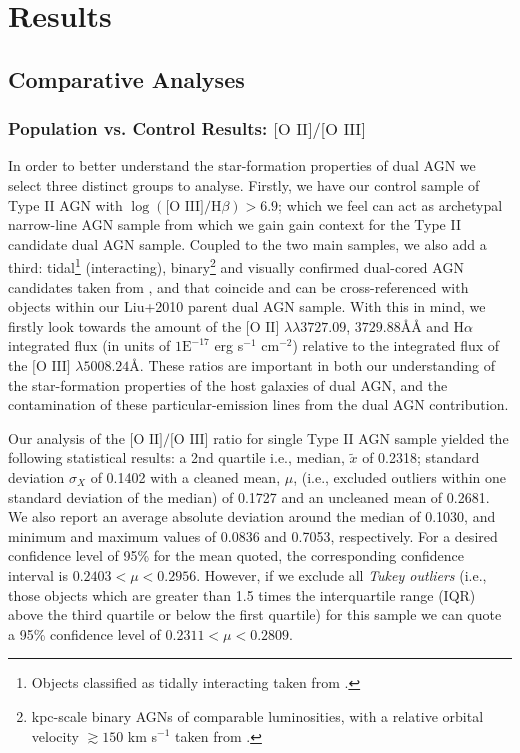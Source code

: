 \section{Results}

\subsection{Comparative Analyses}
 \subsubsection{Population vs. Control Results: $\text{[O II]}/\text{[O III]}$}

In order to better understand the star-formation properties of dual AGN we select three distinct groups to analyse. Firstly, we have our control sample of Type II AGN with $\log{(\text{[O III]}/\text{H}\beta)}>{6.9}$; which we feel can act as archetypal narrow-line AGN sample from which we gain gain context for the Type II candidate dual AGN sample. Coupled to the two main samples, we also add a third: tidal\footnote{\tiny{Objects classified as tidally interacting taken from \cite{Liu_2011}.}} (interacting), binary\footnote{\tiny{kpc-scale binary AGNs of comparable luminosities, with a relative orbital velocity $\gtrsim{150}$ km s$^{-1}$ taken from \cite{Shen_Liu_Greene_Strauss_2011}.}} and visually confirmed dual-cored AGN candidates taken from \cite{Ge_Hu_Wang_Bai_Zhang_2012}, and that coincide and can be cross-referenced with objects within our Liu+2010 parent dual AGN sample. With this in mind, we firstly look towards the amount of the $\text{[O II]}$ $\lambda\lambda$$3727.09$, $3729.88$\AA\AA{} and $\text{H}\alpha$ integrated flux (in units of $1\text{E}^{-17}$ erg s$^{-1}$ cm$^{-2}$) relative to the integrated flux of the $\text{[O III]}$ $\lambda$$5008.24$\AA. These ratios are important in both our understanding of the star-formation properties of the host galaxies of dual AGN, and the contamination of these particular-emission lines from the dual AGN contribution.

Our analysis of the $\text{[O II]/[O III]}$ ratio for single Type II AGN sample yielded the following statistical results: a 2nd quartile i.e., median, $\tilde{x}$ of 0.2318; standard deviation $\sigma_{X}$ of 0.1402 with a cleaned mean, $\mu$, (i.e., excluded outliers within one standard deviation of the median) of 0.1727 and an uncleaned mean of 0.2681. We also report an average absolute deviation around the median of 0.1030, and minimum and maximum values of 0.0836 and 0.7053, respectively. For a desired confidence level of 95\% for the mean quoted, the corresponding confidence interval is ${0.2403}<{\mu}<{0.2956}$. However, if we exclude all \textit{Tukey outliers} (i.e., those objects which are greater than 1.5 times the interquartile range (IQR) above the third quartile or below the first quartile) for this sample we can quote a 95\% confidence level of ${0.2311}<{\mu}<{0.2809}$.

